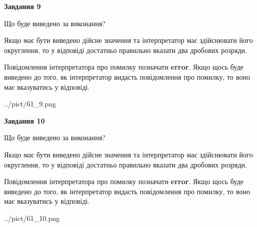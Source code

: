 \documentclass[12pt, ukrainian]{article}
\begin{document}
{\begin {Large}
{\begin {center}\textbf{Завдання 9}\end {center}}\par
Що буде виведено за виконання? \par

Якщо має бути виведено дійсне значення та інтерпретатор має здійснювати його округлення, 
то у відповіді достатньо правильно вказати два дробових розряди.

Повідомлення інтерпретатора про помилку позначати \textbf{error}.
Якщо щось буде виведено до того, як інтерпретатор видасть повідомлення про помилку, 
то воно має вказуватись у відповіді. \par

\begin{center}
	{../pict/61_9.png}
\end{center}
\newpage

{\begin {center}\textbf{Завдання 10}\end {center}}\par
Що буде виведено за виконання? \par

Якщо має бути виведено дійсне значення та інтерпретатор має здійснювати його округлення, 
то у відповіді достатньо правильно вказати два дробових розряди.

Повідомлення інтерпретатора про помилку позначати \textbf{error}.
Якщо щось буде виведено до того, як інтерпретатор видасть повідомлення про помилку, 
то воно має вказуватись у відповіді. \par

\begin{center}
	{../pict/61_10.png}
\end{center}
\newpage

\end {Large}}
\end{document}
